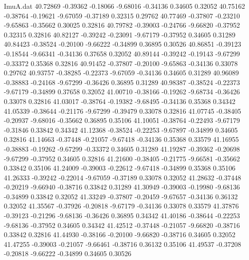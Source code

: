 \begin{filecontents}{ImuA.dat}
  40.72869   -0.39362   -0.18066   -9.68016   -0.34136    0.34605    0.32052
  40.75162   -0.38764   -0.19621   -9.67059   -0.37189    0.32315    0.29762
  40.77469   -0.37807   -0.23210   -9.65863   -0.35662    0.30025    0.32816
  40.79782   -0.39003   -0.24766   -9.66820   -0.37952    0.32315    0.32816
  40.82127   -0.39242   -0.23091   -9.67179   -0.37952    0.34605    0.31289
  40.84423   -0.38524   -0.20100   -9.66222   -0.34899    0.36895    0.30526
  40.86851   -0.39123   -0.18544   -9.66341   -0.34136    0.37658    0.32052
  40.89144   -0.39242   -0.19143   -9.67299   -0.33372    0.35368    0.32816
  40.91452   -0.37807   -0.20100   -9.65863   -0.34136    0.33078    0.29762
  40.93757   -0.38285   -0.22373   -9.67059   -0.34136    0.34605    0.31289
  40.96089   -0.38883   -0.24168   -9.67299   -0.36426    0.36895    0.31289
  40.98387   -0.38524   -0.22373   -9.67179   -0.34899    0.37658    0.32052
  41.00710   -0.38166   -0.19262   -9.68734   -0.36426    0.33078    0.32816
  41.03017   -0.38764   -0.19382   -9.68495   -0.34136    0.35368    0.34342
  41.05339   -0.38644   -0.21176   -9.67299   -0.39479    0.33078    0.32816
  41.07745   -0.38405   -0.20937   -9.68016   -0.35662    0.36895    0.35106
  41.10051   -0.38764   -0.22493   -9.67179   -0.31846    0.33842    0.34342
  41.12368   -0.38524   -0.22253   -9.67897   -0.34899    0.34605    0.32816
  41.14663   -0.37448   -0.21057   -9.67418   -0.34136    0.35368    0.33579
  41.16955   -0.38883   -0.19262   -9.67299   -0.33372    0.34605    0.31289
  41.19287   -0.39362   -0.20698   -9.67299   -0.37952    0.34605    0.32816
  41.21600   -0.38405   -0.21775   -9.66581   -0.35662    0.33842    0.35106
  41.24009   -0.39003   -0.22612   -9.67418   -0.34899    0.35368    0.35106
  41.26333   -0.39242   -0.22014   -9.67059   -0.37189    0.33078    0.32052
  41.28632   -0.37448   -0.20219   -9.66940   -0.38716    0.33842    0.31289
  41.30949   -0.39003   -0.19980   -9.68136   -0.34899    0.33842    0.32052
  41.33249   -0.37807   -0.20459   -9.67657   -0.34136    0.36132    0.32052
  41.35567   -0.37926   -0.20818   -9.67179   -0.34136    0.33078    0.33579
  41.37876   -0.39123   -0.21296   -9.68136   -0.36426    0.36895    0.34342
  41.40186   -0.38644   -0.22253   -9.68136   -0.37952    0.34605    0.34342
  41.42512   -0.37448   -0.21057   -9.66820   -0.38716    0.33842    0.32816
  41.44930   -0.38166   -0.20100   -9.66820   -0.38716    0.34605    0.32052
  41.47255   -0.39003   -0.21057   -9.66461   -0.38716    0.36132    0.35106
  41.49537   -0.37208   -0.20818   -9.66222   -0.34899    0.34605    0.30526

\end{filecontents}
